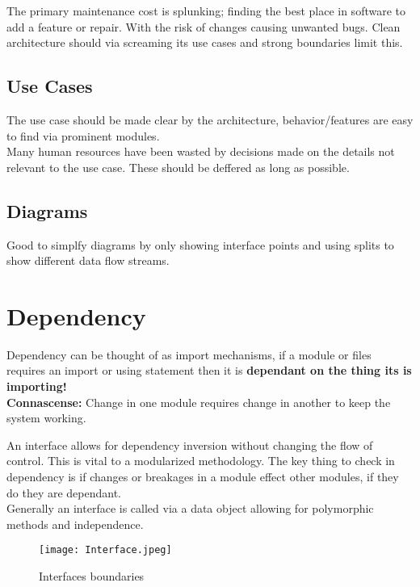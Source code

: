 \documentclass[11pt]{scrartcl} %
\begin{document}
The primary maintenance cost is splunking; finding the best place in software to add a feature or repair.
With the risk of changes causing unwanted bugs. Clean architecture should via screaming its use cases and strong
boundaries limit this.

\subsection{Use Cases}

The use case should be made clear by the architecture, behavior/features are easy to find via
prominent modules.\\

Many human resources have been wasted by decisions made on the details not relevant to the use case.
These should be deffered as long as possible. 

\subsection{Diagrams}

Good to simplfy diagrams by only showing interface points and using splits to show 
different data flow streams.

\section{Dependency}

Dependency can be thought of as import mechanisms, if a module or files requires an import or using
statement then it is \textbf{dependant on the thing its is importing!}\\

\textbf{Connascense:} Change in one module requires change in another to keep the system working.

An interface allows for dependency inversion without changing the flow of control. This is vital
to a modularized methodology. The key thing to check in dependency is if changes or breakages
 in a module effect other modules, if they do they are dependant.\\

Generally an interface is called via a data object allowing for polymorphic methods and independence.\\

\begin{figure}[h] %
	\centering
	\texttt{[image: Interface.jpeg]} %
	\caption{Interfaces boundaries}
\end{figure}
\end{document}
